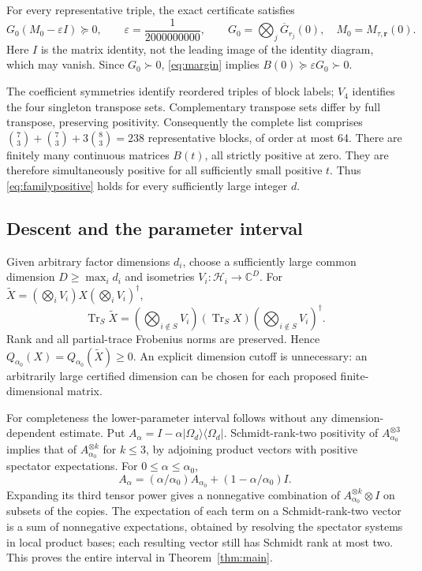 \documentclass[10pt]{article}
\DeclareMathOperator{\Tr}{Tr}
\newcommand{\HH}{\mathcal H}
\newcommand{\CC}{\mathbb C}
\newcommand{\al}{\alpha_0}
\newcommand{\eps}{\varepsilon}
\begin{document}
For every representative triple, the exact certificate satisfies
\begin{equation}\label{eq:margin}
 G_0(M_0-\eps I)\succeq0,
 \qquad \eps=\frac1{2000000000},\qquad
 G_0=\bigotimes_j\overline G_{r_j}(0),\quad M_0=M_{\tau,\mathbf r}(0).
\end{equation}
Here $I$ is the matrix identity, not the leading image of the identity
diagram, which may vanish. Since $G_0\succ0$, \eqref{eq:margin} implies
$B(0)\succeq\eps G_0\succ0$.

The coefficient symmetries identify reordered triples of block labels;
$V_4$ identifies the four singleton transpose sets. Complementary transpose
sets differ by full transpose, preserving positivity. Consequently the
complete list comprises
$\binom73+\binom73+3\binom83=238$ representative blocks, of order at most 64.
There are finitely many continuous matrices $B(t)$, all strictly positive
at zero. They are therefore simultaneously positive for all sufficiently
small positive $t$. Thus \eqref{eq:familypositive} holds for every
sufficiently large integer $d$.

\subsection*{Descent and the parameter interval}
Given arbitrary factor dimensions $d_i$, choose a sufficiently large common
dimension $D\ge\max_i d_i$ and isometries $V_i:\HH_i\to\CC^D$.
For $\widetilde X=(\bigotimes_iV_i)X(\bigotimes_iV_i)^\dagger$,
\[
 \Tr_S\widetilde X=(\bigotimes_{i\notin S}V_i)
                  (\Tr_S X)(\bigotimes_{i\notin S}V_i)^\dagger.
\]
Rank and all partial-trace Frobenius norms are preserved. Hence
$Q_{\al}(X)=Q_{\al}(\widetilde X)\ge0$. An explicit dimension cutoff is
unnecessary: an arbitrarily large certified dimension can be chosen for
each proposed finite-dimensional matrix.

For completeness the lower-parameter interval follows without any
dimension-dependent estimate. Put
$A_\alpha=I-\alpha|\Omega_d\rangle\langle\Omega_d|$.
Schmidt-rank-two positivity of $A_{\al}^{\otimes3}$ implies that of
$A_{\al}^{\otimes k}$ for $k\le3$, by adjoining product vectors with
positive spectator expectations. For $0\le\alpha\le\al$,
\[
 A_\alpha=(\alpha/\al)A_{\al}+(1-\alpha/\al)I.
\]
Expanding its third tensor power gives a nonnegative combination of
$A_{\al}^{\otimes k}\otimes I$ on subsets of the copies. The expectation
of each term on a Schmidt-rank-two vector is a sum of nonnegative
expectations, obtained by resolving the spectator systems in local product
bases; each resulting vector still has Schmidt rank at most two.
This proves the entire interval in Theorem~\ref{thm:main}.
\end{document}
